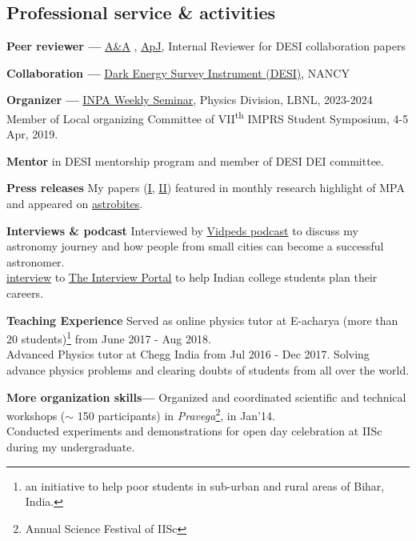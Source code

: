 \documentclass[12pt,letterpaper]{article}
\begin{document}
\subsection{Professional service \& activities}
\begin{list}{}{\cvlist}
    \item \textbf{Peer reviewer ---}
    \href{https://en.wikipedia.org/wiki/Astronomy_%26_Astrophysics}{A\&A}
    , \href{https://en.wikipedia.org/wiki/The_Astrophysical_Journal}{ApJ}, Internal Reviewer for DESI collaboration papers
    \item \textbf{Collaboration ---}
        \href{https://www.desi.lbl.gov/}{Dark Energy Survey Instrument (DESI)}, NANCY
    \item \textbf{Organizer ---}
        \href{https://inpa.lbl.gov/events/}{INPA Weekly Seminar}, Physics Division, LBNL, 2023-2024 \\
        Member of Local organizing Committee of VII\textsuperscript{th} IMPRS Student Symposium, 4-5 Apr, 2019.
    \item \textbf{Mentor} in DESI mentorship program and member of DESI DEI committee.
    \item \textbf{Press releases}
        My papers (\href{https://www.mpa-garching.mpg.de/964620/hl202107}{I}, \href{https://www.mpa-garching.mpg.de/1066558/hl202211?c=27981}{II}) featured in monthly research highlight of MPA and appeared on \href{https://astrobites.org/2021/05/06/cool-metal-gas-search-thanks-it-was-automated/}{astrobites}.
    \item \textbf{Interviews \& podcast}
      Interviewed by \href{https://www.youtube.com/watch?v=WmA_PnYLeCg}{Vidpeds podcast} to discuss my astronomy journey and how people from small cities can become a successful astronomer.\\
      \href{https://theinterviewportal.com/2020/03/13/astrophysicist-interview-8/}{interview} to \href{https://theinterviewportal.com/}{The Interview Portal} to help Indian college students plan their careers.
    \item \textbf{Teaching Experience}
        Served as online physics tutor at E-acharya (more than 20 students)\footnote{an initiative to help poor students in sub-urban and rural areas of Bihar, India.} from June 2017 - Aug 2018. \\
        Advanced Physics tutor at Chegg India from Jul 2016 - Dec 2017. Solving advance physics problems and clearing doubts of students from all over the world.
  \item \textbf{More organization skills---}
        Organized and coordinated scientific and technical workshops ($\sim$ 150 participants) in \emph{Pravega}\footnote{Annual Science Festival of IISc}, in Jan'14.\\
        Conducted experiments and demonstrations for open day celebration at IISc during my undergraduate.
\end{list}
\end{document}
